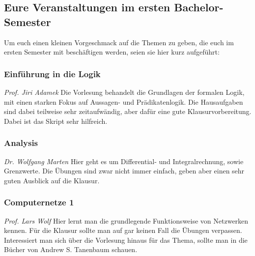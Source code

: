 \begin{multicols}{2}
\subsection{Eure Veranstaltungen im ersten Bachelor-Semester}
	Um euch einen kleinen Vorgeschmack auf die Themen zu geben, die euch im ersten Semester mit beschäftigen werden, seien sie hier kurz aufgeführt:

\subsubsection{Einführung in die Logik}
	\textit{Prof. Jiri Adamek}
	Die Vorlesung behandelt die Grundlagen der formalen Logik, mit einen starken Fokus auf Aussagen- und Prädikatenlogik. Die Hausaufgaben sind dabei teilweise sehr zeitaufwändig, aber dafür eine gute Klausurvorbereitung. Dabei ist das Skript sehr hilfreich.

\subsubsection{Analysis}
	\textit{Dr. Wolfgang Marten}
	Hier geht es um Differential- und Integralrechnung, sowie Grenzwerte. Die Übungen sind zwar nicht immer einfach, geben aber einen sehr guten Ausblick auf die Klausur.

\subsubsection{Computernetze 1}
	\textit{Prof. Lars Wolf}
	Hier lernt man die grundlegende Funktionsweise von Netzwerken kennen. Für die Klausur sollte man auf gar keinen Fall die Übungen verpassen. Interessiert man sich über die Vorlesung hinaus für das Thema, sollte man in die Bücher von Andrew S. Tanenbaum schauen.



\end{multicols}
